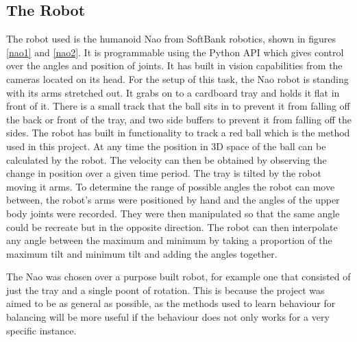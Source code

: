 \documentclass[12pt,a4paper]{article}
\begin{document}
\subsection{The Robot}
The robot used is the humanoid Nao from SoftBank robotics, shown in figures \ref{nao1} and \ref{nao2}. It is programmable using the Python API which gives control over the angles and position of joints. It has built in vision capabilities from the cameras located on its head. For the setup of this task, the Nao robot is standing with its arms stretched out. It grabs on to a cardboard tray and holds it flat in front of it. There is a small track that the ball sits in to prevent it from falling off the back or front of the tray, and two side buffers to prevent it from falling off the sides. The robot has built in functionality to track a red ball which is the method used in this project. At any time the position in 3D space of the ball can be calculated by the robot. The velocity can then be obtained by observing the change in position over a given time period. The tray is tilted by the robot moving it arms. To determine the range of possible angles the robot can move between, the robot's arms were positioned by hand and the angles of the upper body joints were recorded. They were then manipulated so that the same angle could be recreate but in the opposite direction. The robot can then interpolate any angle between the maximum and minimum by taking a proportion of the maximum tilt and minimum tilt and adding the angles together.

The Nao was chosen over a purpose built robot, for example one that consisted of just the tray and a single poont of rotation. This is because the project was aimed to be as general as possible, as the methods used to learn behaviour for balancing will be more useful if the behaviour does not only works for a very specific instance. 

\end{document}
